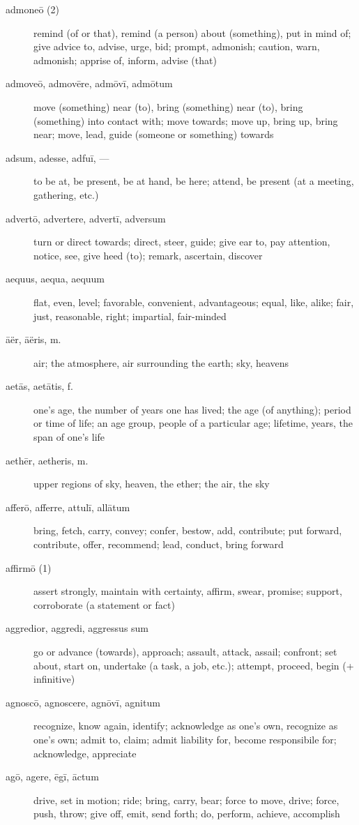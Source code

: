 \begin{description}
    \item[admoneō (2)] remind (of or that), remind (a person) about (something), put in mind of; give advice to, advise, urge, bid; prompt, admonish; caution, warn, admonish; apprise of, inform, advise (that)
    \item[admoveō, admovēre, admōvī, admōtum]  move (something) near (to), bring (something) near (to), bring (something) into contact with; move towards; move up, bring up, bring near; move, lead, guide (someone or something) towards
    \item[adsum, adesse, adfuī, ---] to be at, be present, be at hand, be here; attend, be present (at a meeting, gathering, etc.)
    \item[advertō, advertere, advertī, adversum] turn or direct towards; direct, steer, guide; give ear to, pay attention, notice, see, give heed (to); remark, ascertain, discover
    \item[aequus, aequa, aequum] flat, even, level; favorable, convenient, advantageous; equal, like, alike; fair, just, reasonable, right; impartial, fair-minded
    \item[āër, āëris, m.] air; the atmosphere, air surrounding the earth; sky, heavens
    \item[aetās, aetātis, f.] one's age, the number of years one has lived; the age (of anything); period or time of life; an age group, people of a particular age; lifetime, years, the span of one's life
    \item[aethēr, aetheris, m.] upper regions of sky, heaven, the ether; the air, the sky
    \item[afferō, afferre, attulī, allātum] bring, fetch, carry, convey; confer, bestow, add, contribute; put forward, contribute, offer, recommend; lead, conduct, bring forward
    \item[affirmō (1)] assert strongly, maintain with certainty, affirm, swear, promise; support, corroborate (a statement or fact)
    \item[aggredior, aggredi, aggressus sum] go or advance (towards), approach; assault, attack, assail; confront; set about, start on, undertake (a task, a job, etc.); attempt, proceed, begin (+ infinitive)
    \item[agnoscō, agnoscere, agnōvī, agnitum] recognize, know again, identify; acknowledge as one's own, recognize as one's own; admit to, claim; admit liability for, become responsibile for; acknowledge, appreciate
    \item[agō, agere, ēgī, āctum] drive, set in motion; ride; bring, carry, bear; force to move, drive; force, push, throw; give off, emit, send forth; do, perform, achieve, accomplish

\end{description}
